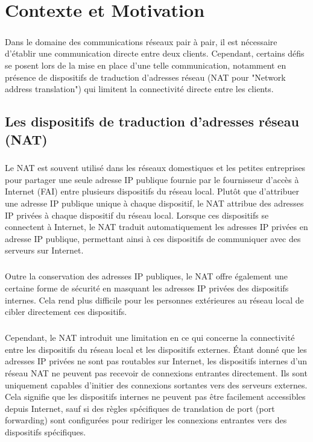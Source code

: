 \chapter{Contexte et Motivation}

\paragraph{}
Dans le domaine des communications réseaux pair à pair, il est nécessaire d'établir une communication directe entre deux clients. Cependant, certains défis se 
posent lors de la mise en place d'une telle communication, notamment en présence de dispositifs de traduction d'adresses réseau (NAT pour "Network address translation") 
qui limitent la connectivité directe entre les clients.


\section{Les dispositifs de traduction d'adresses réseau (NAT)}

\paragraph{}
Le NAT est souvent utilisé dans les réseaux domestiques et les petites entreprises pour partager une seule adresse IP publique fournie par le fournisseur d'accès à Internet (FAI) entre plusieurs dispositifs du réseau local. 
Plutôt que d'attribuer une adresse IP publique unique à chaque dispositif, le NAT attribue des adresses IP privées à chaque dispositif du réseau local. Lorsque ces dispositifs se connectent à Internet, le NAT traduit 
automatiquement les adresses IP privées en adresse IP publique, permettant ainsi à ces dispositifs de communiquer avec des serveurs sur Internet.

\paragraph{}
Outre la conservation des adresses IP publiques, le NAT offre également une certaine forme de sécurité en masquant les adresses IP privées des dispositifs internes. Cela rend plus difficile pour les personnes 
extérieures au réseau local de cibler directement ces dispositifs.

\newpage
\paragraph{}
Cependant, le NAT introduit une limitation en ce qui concerne la connectivité entre les dispositifs du réseau local et les dispositifs externes. Étant donné que les adresses IP privées ne sont pas routables sur Internet, 
les dispositifs internes d'un réseau NAT ne peuvent pas recevoir de connexions entrantes directement. Ils sont uniquement capables d'initier des connexions sortantes vers des serveurs externes. Cela signifie que les dispositifs 
internes ne peuvent pas être facilement accessibles depuis Internet, sauf si des règles spécifiques de translation de port (port forwarding) sont configurées pour rediriger les connexions entrantes vers des dispositifs spécifiques.

